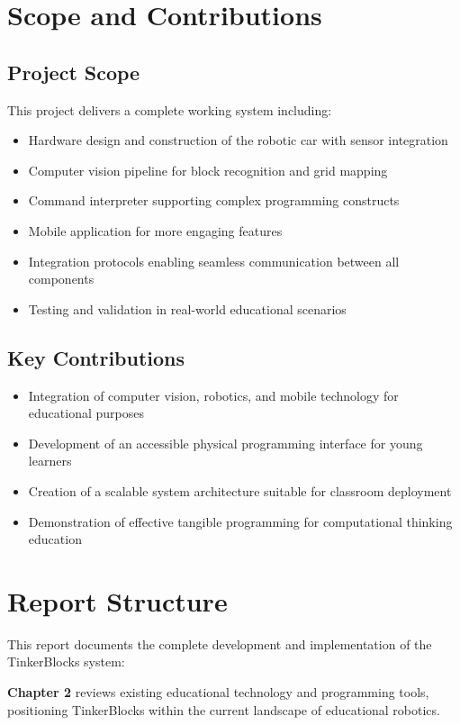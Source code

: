 \section{Scope and Contributions}

\subsection{Project Scope}
This project delivers a complete working system including:
\begin{itemize}
    \item Hardware design and construction of the robotic car with sensor integration
    \item Computer vision pipeline for block recognition and grid mapping
    \item Command interpreter supporting complex programming constructs
    \item Mobile application for more engaging features
    \item Integration protocols enabling seamless communication between all components
    \item Testing and validation in real-world educational scenarios
\end{itemize}

\subsection{Key Contributions}
\begin{itemize}
    \item Integration of computer vision, robotics, and mobile technology for educational purposes
    \item Development of an accessible physical programming interface for young learners
    \item Creation of a scalable system architecture suitable for classroom deployment
    \item Demonstration of effective tangible programming for computational thinking education
\end{itemize}

\section{Report Structure}

This report documents the complete development and implementation of the TinkerBlocks system:

\textbf{Chapter 2} reviews existing educational technology and programming tools, positioning TinkerBlocks within the current landscape of educational robotics.

